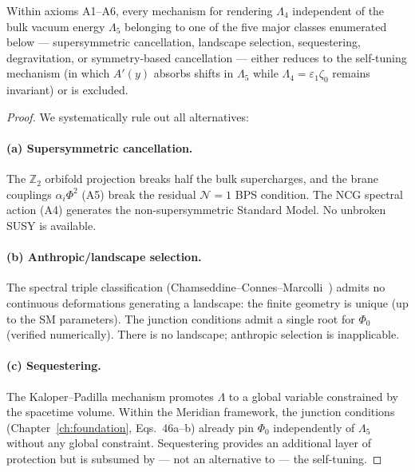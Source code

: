 \begin{proposition}
\label{thm:vnogo-unique}
Within axioms \textup{A1--A6}, every mechanism for rendering $\Lambda_4$ independent of the bulk vacuum energy $\Lambda_5$ belonging to one of the five major classes enumerated below --- supersymmetric cancellation, landscape selection, sequestering, degravitation, or symmetry-based cancellation --- either reduces to the self-tuning mechanism (in which $A'(y)$ absorbs shifts in $\Lambda_5$ while $\Lambda_4 = \varepsilon_1\zeta_0$ remains invariant) or is excluded.
\end{proposition}

\begin{proof}
We systematically rule out all alternatives:

\paragraph{(a) Supersymmetric cancellation.} The $\mathbb{Z}_2$ orbifold projection breaks half the bulk supercharges, and the brane couplings $\alpha_i\Phi^2$ (A5) break the residual $\mathcal{N}=1$ BPS condition. The NCG spectral action (A4) generates the non-supersymmetric Standard Model. No unbroken SUSY is available.

\paragraph{(b) Anthropic/landscape selection.} The spectral triple classification (Chamseddine--Connes--Marcolli~\cite{ch3:chamseddine1997,ch3:connes1994}) admits no continuous deformations generating a landscape: the finite geometry is unique (up to the SM parameters). The junction conditions admit a single root for $\Phi_0$ (verified numerically). There is no landscape; anthropic selection is inapplicable.

\paragraph{(c) Sequestering.} The Kaloper--Padilla mechanism promotes $\Lambda$ to a global variable constrained by the spacetime volume. Within the Meridian framework, the junction conditions (Chapter~\ref{ch:foundation}, Eqs.~46a--b) already pin $\Phi_0$ independently of $\Lambda_5$ without any global constraint. Sequestering provides an additional layer of protection but is subsumed by --- not an alternative to --- the self-tuning.


\end{proof}
